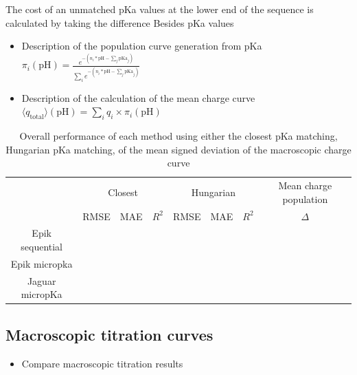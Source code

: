 \documentclass[9pt,lineno]{elife}
\newcommand{\pH}{\mathrm{pH}}
\newcommand{\pKa}{\mathrm{pKa}}
\begin{document}
The cost of an unmatched pKa values at the lower end of the sequence is calculated by taking the difference 
%
Besides pKa values

\begin{itemize}
    \item Description of the population curve generation from pKa \\
    $ \pi_i(\pH) = \frac{e^{-(n_i*\pH - \sum_j \pKa_j)}}{\sum_i e^{-(n_i*\pH - \sum_j \pKa_j)} }$
    \item Description of the calculation of the mean charge curve \\
    $ \langle q_\text{total} \rangle (\pH) = \sum_i q_i \times \pi_i(\pH) $
\end{itemize}

\begin{table}[H]
\centering
\caption{Overall performance of each method using either the closest pKa matching, Hungarian pKa matching, of the mean signed deviation of the macroscopic charge curve}
\label{tab:overview-performance}
\begin{tabular}{c|ccc|ccc|c}
                & \multicolumn{3}{c|}{Closest} & \multicolumn{3}{c|}{Hungarian} & Mean charge population \\ \cline{2-8} 
          & RMSE     & MAE    & $R^2$    & RMSE     & MAE     & $R^2$     & $\Delta $                     \\ \hline
Epik sequential &          &        &          &          &         &           &                        \\
Epik micropka   &          &        &          &          &         &           &                        \\
Jaguar micropKa &          &        &          &          &         &           &                       
\end{tabular}
\end{table}

\subsection{Macroscopic titration curves}
\begin{itemize}
    \item Compare macroscopic titration results
\end{itemize}
\end{document}
